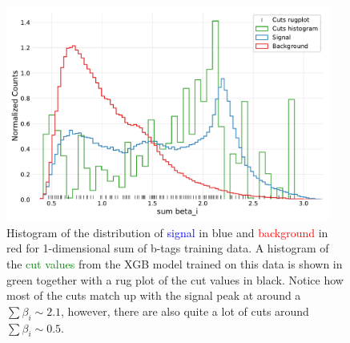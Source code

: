 \documentclass[a4paper, twoside, nobib]{tufte-book}
\begin{document}
\begin{figure}
  \includegraphics[width=0.95\textwidth, trim=10 10 10 20, clip]{figures/quarks/gtag_sum_method_njet=4-down_sample=1.00-ML_vars=vertex-selection=b-ejet_min=4-n_iter_RS_lgb=99-n_iter_RS_xgb=9-cdot_cut=0.90-version=19.pdf}
  \caption[1D Sum Model Cuts for 4-jets]
          {Histogram of the distribution of \textcolor{blue}{signal} in blue and \textcolor{red}{background} in red for 1-dimensional sum of b-tags training data. A histogram of the \textcolor{green}{cut values} from the XGB model trained on this data is shown in green together with a rug plot of the cut values in black. Notice how most of the cuts match up with the signal peak at around a $\sum \beta_i \sim 2.1$, however, there are also quite a lot of cuts around $\sum \beta_i \sim 0.5$.
          } 
  \label{fig:q:1d_sum_model_cuts_4j}
\end{figure}
\end{document}
